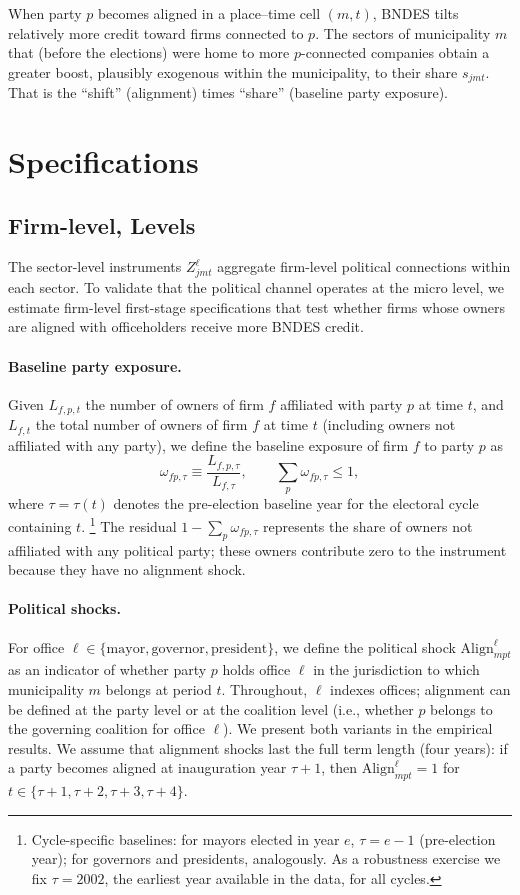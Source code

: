 \documentclass{article}
\newcommand{\Align}{\mathrm{Align}}
\begin{document}
When party $p$ becomes aligned in a place–time cell $(m,t)$, BNDES tilts relatively more credit toward firms connected to $p$. The sectors of municipality $m$ that (before the elections) were home to more $p$-connected companies obtain a greater boost, plausibly exogenous within the municipality, to their share $s_{jmt}$. That is the “shift” (alignment) times “share” (baseline party exposure).

\section{Specifications}


\subsection{Firm-level, Levels}

The sector-level instruments $Z^{\ell}_{jmt}$ aggregate firm-level political connections within each sector. To validate that the political channel operates at the micro level, we estimate firm-level first-stage specifications that test whether firms whose owners are aligned with officeholders receive more BNDES credit.

\paragraph{Baseline party exposure.}
Given $L_{f,p,t}$ the number of owners of firm $f$ affiliated with party $p$ at time $t$,
and $L_{f,t}$ the total number of owners of firm $f$ at time $t$
(including owners not affiliated with any party),
we define the baseline exposure of firm $f$ to party $p$ as
\[
  \omega_{fp,\tau} \equiv \frac{L_{f,p,\tau}}{L_{f,\tau}},
  \qquad
  \sum_{p} \omega_{fp,\tau} \leq 1,
\]
where $\tau = \tau(t)$ denotes the pre-election baseline year for the electoral cycle
containing $t$.%
\footnote{Cycle-specific baselines: for mayors elected in year $e$,
$\tau = e - 1$ (pre-election year);
for governors and presidents, analogously.
As a robustness exercise we fix $\tau = 2002$, the earliest year available in the data, for all cycles.}
The residual $1 - \sum_p \omega_{fp,\tau}$ represents the share of owners
not affiliated with any political party;
these owners contribute zero to the instrument because they have no alignment shock.

\paragraph{Political shocks.}
For office $\ell\in\{\mathrm{mayor},\mathrm{governor},\mathrm{president}\}$, we define the political shock $\Align^{\ell}_{mpt}$ as an indicator of whether party $p$ holds office $\ell$ in the jurisdiction to which municipality $m$ belongs at period $t$. Throughout, $\ell$ indexes offices; alignment can be defined at the party level or at the coalition level (i.e., whether $p$ belongs to the governing coalition for office $\ell$). We present both variants in the empirical results. We assume that alignment shocks last the full term length (four years): if a party becomes aligned at inauguration year $\tau+1$, then $\Align^{\ell}_{mpt} = 1$ for $t \in \{\tau+1, \tau + 2, \tau + 3, \tau + 4\}$.
\end{document}
